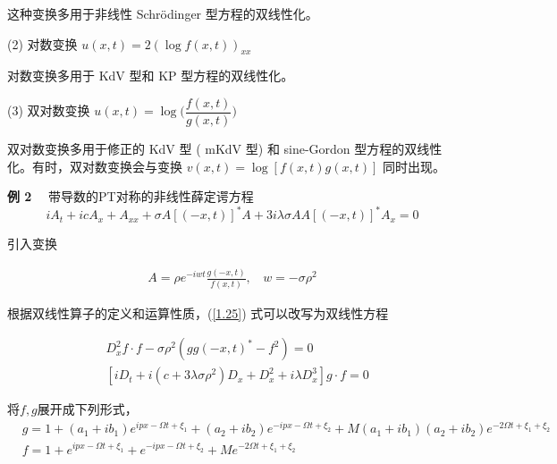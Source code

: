 这种变换多用于非线性 Schr\"{o}dinger 型方程的双线性化。

(2) 对数变换 $ u(x, t)=2(\log{f(x, t)})_{xx} $

对数变换多用于 KdV 型和 KP 型方程的双线性化。

(3) 双对数变换 $ u(x, t)=\log{\big(\dfrac{f(x, t)}{g(x, t)}\big)} $

双对数变换多用于修正的 KdV 型 ( mKdV 型) 和 sine-Gordon 型方程的双线性化。有时，双对数变换会与变换 $ v(x, t)=\log{[f(x, t)g(x, t)]} $ 同时出现。

{\textbf{例 2}} \ \ 带导数的PT对称的非线性薛定谔方程
\begin{equation}
iA_t+icA_x+A_{xx}+\sigma A[(-x,t)]^{*}A+3i\lambda\sigma AA[(-x,t)]^{*}A_x=0\label{1.25}
\end{equation}

引入变换

\begin{align*}
A=\rho e^{-iwt}\frac{g(-x,t)}{f(x,t)},~~~~w=-\sigma\rho^2
\end{align*}

根据双线性算子的定义和运算性质，(\ref{1.25}) 式可以改写为双线性方程

\begin{align}
& D_x^2f \cdot f-\sigma\rho^2(gg(-x,t)^{*}-f^2)=0\\
& [iD_t+i(c+3\lambda\sigma\rho^2)D_x+D_x^2+i\lambda D_x^3]g \cdot f=0
\end{align}

将$f, g$展开成下列形式，
\begin{align*}
& g=1+(a_1+ib_1)e^{ipx-\Omega t+\xi_1}+(a_2+ib_2)e^{-ipx-\Omega t+\xi_2}+M(a_1+ib_1)(a_2+ib_2)e^{-2\Omega t+\xi_1+\xi_2}\\
& f=1+e^{ipx-\Omega t+\xi_1}+e^{-ipx-\Omega t+\xi_2}+Me^{-2\Omega t+\xi_1+\xi_2}
\end{align*}

